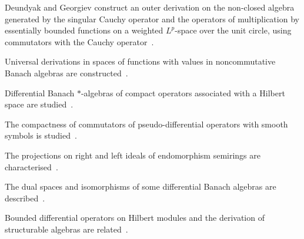 Deundyak and Georgiev construct an outer derivation on the non-closed algebra generated by the singular Cauchy operator and the operators of multiplication by essentially bounded functions on a weighted $L^p$-space over the unit circle, using commutators with the Cauchy operator~\cite{WlAnOuterDerivationConstructionO2020}.

Universal derivations in spaces of functions with values in noncommutative Banach algebras are constructed~\cite{WlUniversalDerivationsInSpacesOf2020}.

Differential Banach $*$-algebras of compact operators associated with a Hilbert space are studied~\cite{WlDifferentialBanachAlgebrasOfCo2020}.

The compactness of commutators of pseudo-differential operators with smooth symbols is studied~\cite{WlCompactnessOfCommutatorsOfPseu2020}.

The projections on right and left ideals of endomorphism semirings are characterised~\cite{WlProjectionsOnRightAndLeftIdeal2020}.

The dual spaces and isomorphisms of some differential Banach algebras are described~\cite{WlDualSpacesAndIsomorphismsOfSom2020}.

Bounded differential operators on Hilbert modules and the derivation of structurable algebras are related~\cite{WlBoundedDifferentialOperatorsOn2020}.
